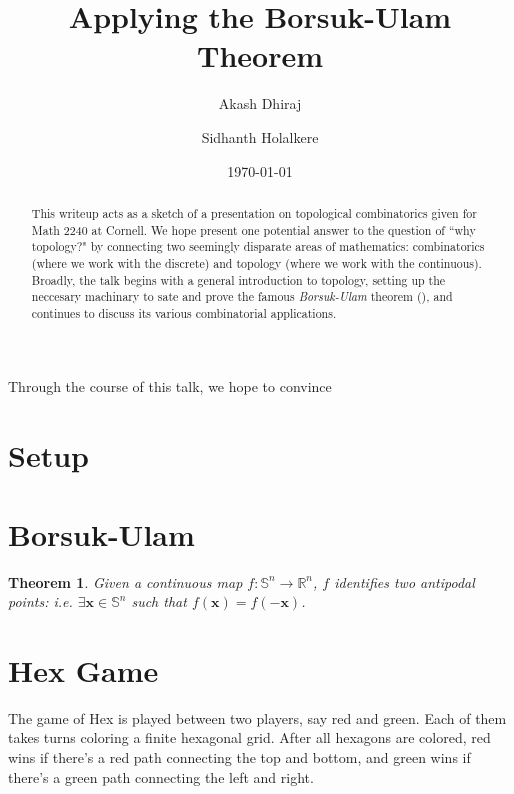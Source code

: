 \documentclass[12pt]{amsart}
\newtheorem{theorem}{Theorem}
\begin{document}
    \title{Applying the Borsuk-Ulam Theorem}
    \author{Akash Dhiraj}
    \author{Sidhanth Holalkere}
    \date{\today}

    \begin{abstract}
        This writeup acts as a sketch of a presentation on topological combinatorics given for Math 2240 at Cornell. We hope present one potential answer to the question of ``why topology?" by connecting two seemingly disparate areas of mathematics: combinatorics (where we work with the discrete) and topology (where we work with the continuous). Broadly, the talk begins with a general introduction to topology, setting up the neccesary machinary to sate and prove the famous \emph{Borsuk-Ulam} theorem (), and continues to discuss its various combinatorial applications. 
    \end{abstract}

    \maketitle

    Through the course of this talk, we hope to convince 

    \section{Setup}

    \newpage

    \section{Borsuk-Ulam}

    \begin{theorem}
        Given a continuous map $f: \mathbb S^n \to \mathbb R^n$, $f$ identifies two antipodal points: i.e. $\exists \mathbf x \in \mathbb S^n$ such that $f(\mathbf x) = f(-\mathbf x)$.
    \end{theorem}

    \newpage

    \section{Hex Game}

    The game of Hex is played between two players, say red and green. Each of them takes turns coloring a finite hexagonal grid. After all hexagons are colored, red wins if there's a red path connecting the top and bottom, and green wins if there's a green path connecting the left and right. 
\end{document}
